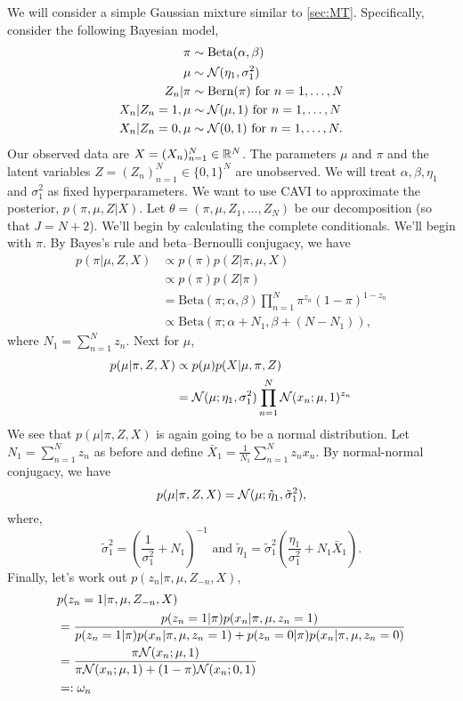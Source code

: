 We will consider a simple Gaussian mixture similar to \ref{sec:MT}. Specifically, consider the following Bayesian model,
\begin{align*}
    \pi & \sim \mathrm{Beta}(\alpha,\beta)\\
    \mu & \sim {\mathcal N}(\eta_1, \sigma_1^2)\\
    Z_n  |  \pi & \sim \mathrm{Bern}(\pi) \text{ for } n =1,\ldots,N\\
    X_n  |  Z_n=1, \mu & \sim {\mathcal N}(\mu, 1) \text{ for } n = 1,\ldots,N\\
    X_n  |  Z_n=0, \mu & \sim {\mathcal N}(0, 1) \text{ for } n = 1,\ldots,N.
\end{align*}
Our observed data are $X=(X_n)_{n=1}^N \in \mathbb{R}^N$. The parameters $\mu$ and $\pi$ and the latent variables $Z=(Z_n)_{n=1}^N \in \{0,1\}^N$ are unobserved. We will treat $\alpha,\beta, \eta_1$ and $\sigma_1^2$ as fixed hyperparameters. We want to use CAVI to approximate the posterior, $p(\pi,\mu,Z  |  X).$ Let $\theta = (\pi,\mu,Z_1,\ldots,Z_N)$ be our decomposition (so that $J=N+2$). We'll begin by calculating the complete conditionals. We'll begin with $\pi$. By Bayes's rule and beta--Bernoulli conjugacy, we have
\begin{align*}
    p(\pi  |  \mu,Z,X)&\propto p(\pi)p(Z |  \pi,\mu, X)\\
    &\propto p(\pi)p(Z |  \pi)\\
    &= \mathrm{Beta}(\pi ; \alpha,\beta) \prod_{n=1}^N \pi^{z_n}(1-\pi)^{1-z_n}\\
    &\propto \mathrm{Beta}(\pi; \alpha + N_1, \beta + (N-N_1)),
\end{align*}
where $N_1 = \sum_{n=1}^N z_n$. Next for $\mu$,
\begin{align*}
    p(\mu  |  \pi,Z,X)&\propto p(\mu)p(X  |  \mu,\pi,Z)\\
    &= {\mathcal N}(\mu;\eta_1,\sigma_1^2)\prod_{n=1}^N {\mathcal N}(x_n;\mu,1)^{z_n}
\end{align*}
We see that $p(\mu  |  \pi,Z,X)$ is again going to be a normal distribution. Let $N_1 = \sum_{n=1}^N z_n$ as before and define $\bar{X}_1 = \frac{1}{N_1}\sum_{n=1}^N z_nx_n$. By normal-normal conjugacy, we have
\[p(\mu  |  \pi,Z,X) ={\mathcal N}(\mu;\tilde{\eta}_1,\tilde{\sigma}_1^2), \]
where,
\[\tilde{\sigma}_1^2 = \left(\frac{1}{\sigma_1^2}+N_1\right)^{-1} \text{ and } \tilde{\eta}_1 = \tilde{\sigma}_1^2\left(\frac{\eta_1}{\sigma_1^2}+N_1\bar{X}_1\right). \]
Finally, let's work out $p(z_n  |  \pi,\mu,Z_{-n},X)$,
\begin{align*}
    &p(z_n=1 |  \pi,\mu,Z_{-n},X)\\
    &= \frac{p(z_n=1 |  \pi)p(x_n  |  \pi,\mu,z_n=1)}{p(z_n=1 |  \pi)p(x_n  |  \pi,\mu,z_n=1)+p(z_n=0 |  \pi)p(x_n  |  \pi,\mu,z_n=0)}\\
    &=\frac{\pi {\mathcal N}(x_n;\mu,1)}{\pi{\mathcal N}(x_n;\mu,1)+(1-\pi){\mathcal N}(x_n;0,1)}\\
    &=: \omega_{n}
\end{align*}
